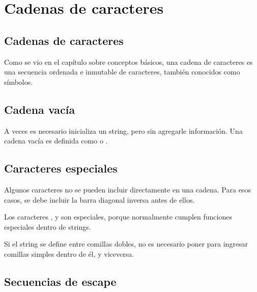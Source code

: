 \chapter{Cadenas de caracteres}

\section{Cadenas de caracteres}

Como se vio en el capítulo sobre conceptos básicos, una cadena de caracteres es una secuencia ordenada e inmutable de caracteres, también conocidos como símbolos.


\section{Cadena vacía}

A veces es necesario inicializa un string, pero sin agregarle información.
Una cadena vacía es definida como \ttt{\q \q} o \ttt{\qq \qq}.


\section{Caracteres especiales}

Algunos caracteres no se pueden incluir directamente en una cadena.
Para esos casos, se debe incluir la barra diagonal inversa \ttt{\textbackslash} antes de ellos.


Los caracteres \ttt{\q}, \ttt{\qq} y \ttt{\textbackslash} son especiales, porque normalmente cumplen funciones especiales dentro de strings.

Si el string se define entre comillas dobles, no es necesario poner \ttt{\q} para ingresar comillas simples dentro de él, y viceversa.


\section{Secuencias de escape}

